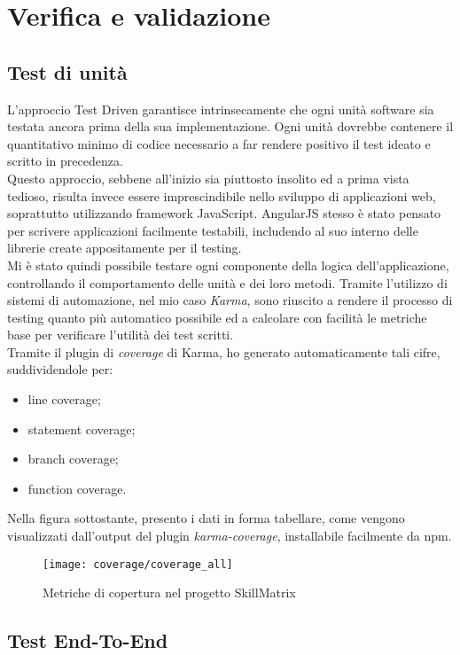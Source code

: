 
\chapter{Verifica e validazione}
\label{cap:verifica-validazione}

\section{Test di unità}
L'approccio Test Driven garantisce intrinsecamente che ogni unità software sia testata ancora prima della sua implementazione. Ogni unità dovrebbe contenere il quantitativo minimo di codice necessario a far rendere positivo il test ideato e scritto in precedenza.\\
Questo approccio, sebbene all'inizio sia piuttosto insolito ed a prima vista tedioso, risulta invece essere imprescindibile nello sviluppo di applicazioni web, soprattutto utilizzando framework JavaScript. AngularJS stesso è stato pensato per scrivere applicazioni facilmente testabili, includendo al suo interno delle librerie create appositamente per il testing.\\
Mi è stato quindi possibile testare ogni componente della logica dell'applicazione, controllando il comportamento delle unità e dei loro metodi. Tramite l'utilizzo di sistemi di automazione, nel mio caso \emph{Karma}, sono riuscito a rendere il processo di testing quanto più automatico possibile ed a calcolare con facilità le metriche base per verificare l'utilità dei test scritti.\\
Tramite il plugin di \emph{coverage} di Karma, ho generato automaticamente tali cifre, suddividendole per:
\begin{itemize}
	\item line coverage;
	\item statement coverage;
	\item branch coverage;
	\item function coverage.
\end{itemize}
Nella figura sottostante, presento i dati in forma tabellare, come vengono visualizzati dall'output del plugin \emph{karma-coverage}, installabile facilmente da \gls{npm}.

\begin{figure}[!h] 
    \centering 
    \texttt{[image: coverage/coverage\_all]} 
    \caption{Metriche di copertura nel progetto SkillMatrix}
\end{figure}

\section{Test End-To-End}
